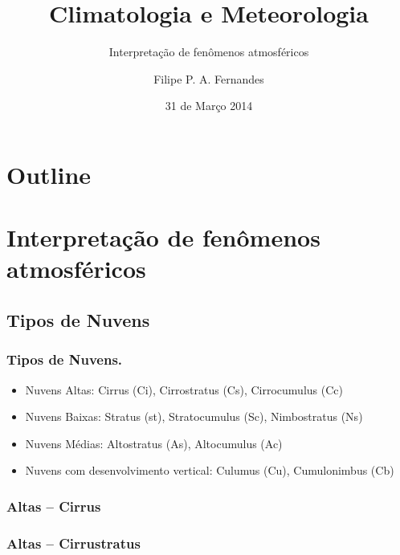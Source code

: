 \title[Aula 07]{Climatologia e Meteorologia}
\subtitle{Interpretação de fenômenos atmosféricos}
\author[Filipe Fernandes]{Filipe P. A. Fernandes}
\date[Março 2014]{31 de Março 2014}




\begin{frame}[plain]
  \titlepage
\end{frame}

\section*{Outline}
\begin{frame}
\tableofcontents
\end{frame}

\section{Interpretação de fenômenos atmosféricos}
\subsection{Tipos de Nuvens}
\begin{frame}
\frametitle{Tipos de Nuvens.}
  \begin{itemize}[<+-| alert@+>]
    \item Nuvens Altas: Cirrus (Ci), Cirrostratus (Cs), Cirrocumulus (Cc)
    \item Nuvens Baixas: Stratus (st), Stratocumulus (Sc), Nimbostratus (Ns)
    \item Nuvens Médias: Altostratus (As), Altocumulus (Ac)
    \item Nuvens com desenvolvimento vertical: Culumus (Cu), Cumulonimbus (Cb)
  \end{itemize}
\end{frame}

\begin{frame}
\frametitle{Altas -- Cirrus}
  \begin{center}
  \end{center}
\end{frame}

\begin{frame}
\frametitle{Altas -- Cirrustratus}
  \begin{center}
  \end{center}
\end{frame}

